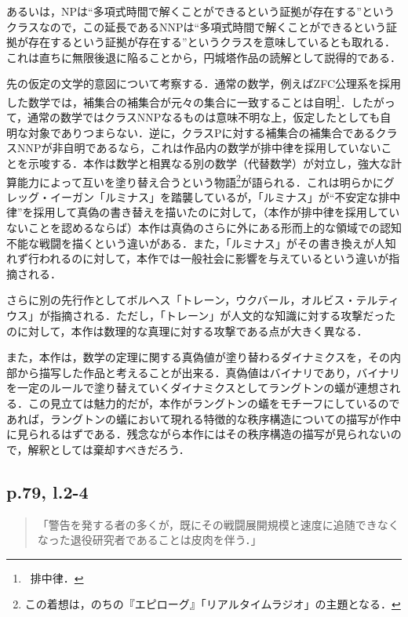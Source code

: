 \documentclass[10pt, a5paper, twoside]{ltjsarticle}
\begin{document}
            あるいは，NPは“多項式時間で解くことができるという証拠が存在する”というクラスなので，この延長であるNNPは“多項式時間で解くことができるという証拠が存在するという証拠が存在する”というクラスを意味しているとも取れる．これは直ちに無限後退に陥ることから，円城塔作品の読解として説得的である．

            先の仮定の文学的意図について考察する．通常の数学，例えばZFC公理系を採用した数学では，補集合の補集合が元々の集合に一致することは自明\footnote{\because \, 排中律．}．したがって，通常の数学ではクラスNNPなるものは意味不明な上，仮定したとしても自明な対象でありつまらない．逆に，クラスPに対する補集合の補集合であるクラスNNPが非自明であるなら，これは作品内の数学が排中律を採用していないことを示唆する．本作は数学と相異なる別の数学（代替数学）が対立し，強大な計算能力によって互いを塗り替え合うという物語\footnote{この着想は，のちの『エピローグ』「リアルタイムラジオ」の主題となる．}が語られる．これは明らかにグレッグ・イーガン「ルミナス」を踏襲しているが，「ルミナス」が“不安定な排中律”を採用して真偽の書き替えを描いたのに対して，（本作が排中律を採用していないことを認めるならば）本作は真偽のさらに外にある形而上的な領域での認知不能な戦闘を描くという違いがある．また，「ルミナス」がその書き換えが人知れず行われるのに対して，本作では一般社会に影響を与えているという違いが指摘される．

            さらに別の先行作としてボルヘス「トレーン，ウクバール，オルビス・テルティウス」が指摘される．ただし，「トレーン」が人文的な知識に対する攻撃だったのに対して，本作は数理的な真理に対する攻撃である点が大きく異なる．

            また，本作は，数学の定理に関する真偽値が塗り替わるダイナミクスを，その内部から描写した作品と考えることが出来る．真偽値はバイナリであり，バイナリを一定のルールで塗り替えていくダイナミクスとしてラングトンの蟻が連想される．この見立ては魅力的だが，本作がラングトンの蟻をモチーフにしているのであれば，ラングトンの蟻において現れる特徴的な秩序構造についての描写が作中に見られるはずである．残念ながら本作にはその秩序構造の描写が見られないので，解釈としては棄却すべきだろう．

        \subsection{p.79, l.2-4}

            \begin{quote}
                「警告を発する者の多くが，既にその戦闘展開規模と速度に追随できなくなった退役研究者であることは皮肉を伴う．」
            \end{quote}
\end{document}
